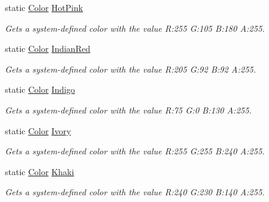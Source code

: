 \begin{DoxyCompactItemize}
static \hyperlink{struct_microsoft_1_1_xna_1_1_framework_1_1_color}{Color} \hyperlink{struct_microsoft_1_1_xna_1_1_framework_1_1_color_a3fafff23ce6f9973148598f2181ed0d6}{Hot\+Pink}
\begin{DoxyCompactList}\small\item\em Gets a system-\/defined color with the value R\+:255 G\+:105 B\+:180 A\+:255.\end{DoxyCompactList}\item 
static \hyperlink{struct_microsoft_1_1_xna_1_1_framework_1_1_color}{Color} \hyperlink{struct_microsoft_1_1_xna_1_1_framework_1_1_color_a8341ec9f16f4841ffdd2641b039abd77}{Indian\+Red}
\begin{DoxyCompactList}\small\item\em Gets a system-\/defined color with the value R\+:205 G\+:92 B\+:92 A\+:255.\end{DoxyCompactList}\item 
static \hyperlink{struct_microsoft_1_1_xna_1_1_framework_1_1_color}{Color} \hyperlink{struct_microsoft_1_1_xna_1_1_framework_1_1_color_a01840fe449cce8541464218c773fae16}{Indigo}
\begin{DoxyCompactList}\small\item\em Gets a system-\/defined color with the value R\+:75 G\+:0 B\+:130 A\+:255.\end{DoxyCompactList}\item 
static \hyperlink{struct_microsoft_1_1_xna_1_1_framework_1_1_color}{Color} \hyperlink{struct_microsoft_1_1_xna_1_1_framework_1_1_color_aac9b5ec33986b8d13f4b32926d23b25b}{Ivory}
\begin{DoxyCompactList}\small\item\em Gets a system-\/defined color with the value R\+:255 G\+:255 B\+:240 A\+:255.\end{DoxyCompactList}\item 
static \hyperlink{struct_microsoft_1_1_xna_1_1_framework_1_1_color}{Color} \hyperlink{struct_microsoft_1_1_xna_1_1_framework_1_1_color_a042a1656e4aab1deed27ad03e3e7e1af}{Khaki}
\begin{DoxyCompactList}\small\item\em Gets a system-\/defined color with the value R\+:240 G\+:230 B\+:140 A\+:255.\end{DoxyCompactList}\item 

\end{DoxyCompactItemize}

